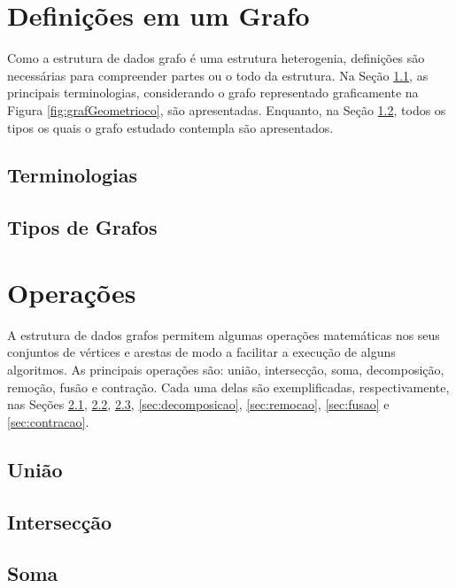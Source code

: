 \documentclass[
12pt,
a4paper,
semrecuonosumario,
sumario = abnt-6027-2012]{report}
\begin{document}
	\chapter{Definições em um Grafo }\label{cap:definicoesGrafo}

	Como a estrutura de dados grafo é uma estrutura heterogenia, definições são necessárias para compreender partes ou o todo da estrutura. Na Seção \ref{sec:terminologias}, as principais terminologias, considerando o grafo representado graficamente na Figura  \ref{fig:grafGeometrioco}, são apresentadas. Enquanto, na Seção \ref{sec:tiposGrafos}, todos os tipos os quais o grafo estudado contempla são apresentados.

	\section{Terminologias}\label{sec:terminologias}


	\section{Tipos de Grafos}\label{sec:tiposGrafos}

		
	\chapter{Operações}\label{cap:operacoes}
	
	A estrutura de dados grafos permitem algumas operações matemáticas nos seus conjuntos de vértices e arestas de modo a facilitar a execução de alguns algoritmos. As principais operações são: união, intersecção, soma, decomposição, remoção, fusão e contração. Cada uma delas são exemplificadas, respectivamente, nas Seções \ref{sec:uniao}, \ref{sec:interseccao}, \ref{sec:soma}, \ref{sec:decomposicao}, \ref{sec:remocao}, \ref{sec:fusao} e \ref{sec:contracao}.
	
	\section{União}\label{sec:uniao}
	
	\section{Intersecção}\label{sec:interseccao}
	
	\section{Soma}\label{sec:soma}
	
\end{document}

